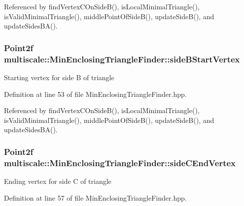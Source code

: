 Referenced by find\-Vertex\-C\-On\-Side\-B(), is\-Local\-Minimal\-Triangle(), is\-Valid\-Minimal\-Triangle(), middle\-Point\-Of\-Side\-B(), update\-Side\-B(), and update\-Sides\-B\-A().

\hypertarget{classmultiscale_1_1MinEnclosingTriangleFinder_a5f6c0f9361e4aab168f068f08b700742}{
\subsubsection[{side\-B\-Start\-Vertex}]{\setlength{\rightskip}{0pt plus 5cm}Point2f multiscale\-::\-Min\-Enclosing\-Triangle\-Finder\-::side\-B\-Start\-Vertex\hspace{0.3cm}{\ttfamily [private]}}}\label{classmultiscale_1_1MinEnclosingTriangleFinder_a5f6c0f9361e4aab168f068f08b700742}
Starting vertex for side B of triangle 

Definition at line 53 of file Min\-Enclosing\-Triangle\-Finder.\-hpp.



Referenced by find\-Vertex\-C\-On\-Side\-B(), is\-Local\-Minimal\-Triangle(), is\-Valid\-Minimal\-Triangle(), middle\-Point\-Of\-Side\-B(), update\-Side\-B(), and update\-Sides\-B\-A().

\hypertarget{classmultiscale_1_1MinEnclosingTriangleFinder_a3f0f5bbef4e89caed8d153f1fc2eccea}{
\subsubsection[{side\-C\-End\-Vertex}]{\setlength{\rightskip}{0pt plus 5cm}Point2f multiscale\-::\-Min\-Enclosing\-Triangle\-Finder\-::side\-C\-End\-Vertex\hspace{0.3cm}{\ttfamily [private]}}}\label{classmultiscale_1_1MinEnclosingTriangleFinder_a3f0f5bbef4e89caed8d153f1fc2eccea}
Ending vertex for side C of triangle 

Definition at line 57 of file Min\-Enclosing\-Triangle\-Finder.\-hpp.



